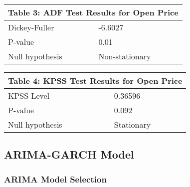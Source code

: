 \begin{table}[]
\centering
\begin{tabular}{|l|l|l|l|l|}
\hline
\multicolumn{5}{|l|}{Table 3: ADF Test Results for Open Price}              \\ \hline
\multicolumn{3}{|l|}{Dickey-Fuller}   & \multicolumn{2}{l|}{-6.6027}        \\ \hline
\multicolumn{3}{|l|}{P-value}         & \multicolumn{2}{l|}{0.01}           \\ \hline
\multicolumn{3}{|l|}{Null hypothesis} & \multicolumn{2}{l|}{Non-stationary} \\ \hline
\end{tabular}
\end{table}

\begin{table}[]
\centering
\begin{tabular}{|l|l|l|l|l|}
\hline
\multicolumn{5}{|l|}{Table 4: KPSS Test Results for Open Price}         \\ \hline
\multicolumn{3}{|l|}{KPSS Level}      & \multicolumn{2}{l|}{0.36596}    \\ \hline
\multicolumn{3}{|l|}{P-value}         & \multicolumn{2}{l|}{0.092}      \\ \hline
\multicolumn{3}{|l|}{Null hypothesis} & \multicolumn{2}{l|}{Stationary} \\ \hline
\end{tabular}
\end{table}

\subsection{ARIMA-GARCH Model}
\subsubsection{ARIMA Model Selection}

